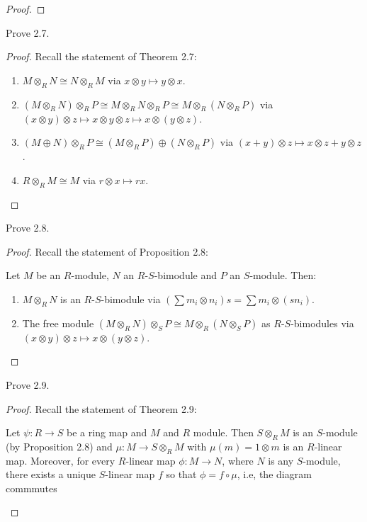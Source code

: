 \begin{proof}
\end{proof}
\newpage
\begin{problem}
Prove 2.7.
\end{problem}
\begin{proof}
Recall the statement of Theorem 2.7:
\begin{theorem*}
\begin{enumerate}[noitemsep,label=(\alph*)]
\item $M\otimes_R N\cong N\otimes_R M$ via $x\otimes y\mapsto
  y\otimes x$.
\item $(M\otimes_R N)\otimes_R P\cong M\otimes_R N\otimes_R
  P\cong M\otimes_R(N\otimes_R P)$ via $(x\otimes y)\otimes
  z\mapsto x\otimes y\otimes z\mapsto x\otimes (y\otimes z)$.
\item $(M\oplus N)\otimes_R P\cong (M\otimes_R P)\oplus
  (N\otimes_R P)$ via $(x+y)\otimes z\mapsto x\otimes z+y\otimes
  z$.
\item $R\otimes_R M\cong M$ via $r\otimes x\mapsto rx$.
\end{enumerate}
\end{theorem*}
\end{proof}
\newpage
\begin{problem}
Prove 2.8.
\end{problem}
\begin{proof}
Recall the statement of Proposition 2.8:
\begin{proposition*}
Let $M$ be an $R$-module, $N$ an $R$-$S$-bimodule and $P$ an
$S$-module. Then:
\begin{enumerate}[noitemsep,label=(\alph*)]
\item $M\otimes_R N$ is an $R$-$S$-bimodule via $\left(\sum
    m_i\otimes n_i\right)s=\sum m_i\otimes (sn_i).$
\item The free module $(M\otimes_R N)\otimes_S P\cong M\otimes_R
  (N\otimes_S P)$ as $R$-$S$-bimodules via $(x\otimes y)\otimes
  z\mapsto x\otimes (y\otimes z)$.
\end{enumerate}
\end{proposition*}
\end{proof}
\newpage
\begin{problem}
Prove 2.9.
\end{problem}
\begin{proof}
Recall the statement of Theorem 2.9:
\begin{theorem*}
Let $\psi\colon R\to S$ be a ring map and $M$ and $R$
module. Then $S\otimes_R M$ is an $S$-module (by Proposition
2.8) and $\mu\colon M\to S\otimes_R M$ with $\mu(m)=1\otimes m$
is an $R$-linear map. Moreover, for every $R$-linear map
$\phi\colon M\to N$, where $N$ is any $S$-module, there exists a
unique $S$-linear map $f$ so that $\phi=f\circ\mu$, i.e, the
diagram commmutes
\end{theorem*}
\end{proof}
